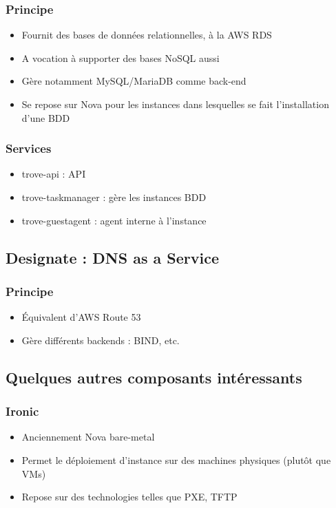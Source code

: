   \begin{frame}
    \frametitle{Principe}
    \begin{itemize}
      \item Fournit des bases de données relationnelles, à la AWS RDS
      \item A vocation à supporter des bases NoSQL aussi
      \item Gère notamment MySQL/MariaDB comme back-end
      \item Se repose sur Nova pour les instances dans lesquelles se fait l'installation d'une BDD
    \end{itemize}
  \end{frame}

  \begin{frame}
    \frametitle{Services}
    \begin{itemize}
      \item trove-api : API
      \item trove-taskmanager : gère les instances BDD
      \item trove-guestagent : agent interne à l'instance
    \end{itemize}
  \end{frame}

  \subsection[Designate]{Designate : DNS as a Service}

  \begin{frame}
    \frametitle{Principe}
    \begin{itemize}
      \item Équivalent d'AWS Route 53
      \item Gère différents backends : BIND, etc.
    \end{itemize}
  \end{frame}

  \subsection[Les autres]{Quelques autres composants intéressants}

  \begin{frame}
    \frametitle{Ironic}
    \begin{itemize}
      \item Anciennement Nova bare-metal
      \item Permet le déploiement d'instance sur des machines physiques (plutôt que VMs)
      \item Repose sur des technologies telles que PXE, TFTP
    \end{itemize}
  \end{frame}

